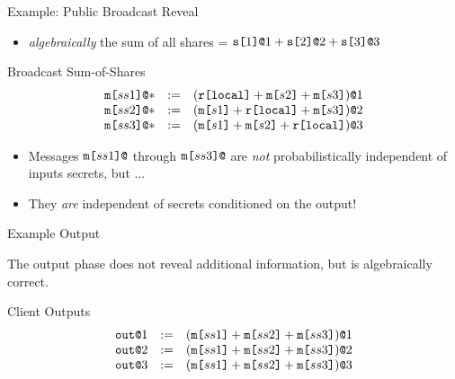 \documentclass{beamer}
\begin{document}
\begin{frame}{Example: Public Broadcast Reveal}

  \begin{itemize}
   \item \emph{algebraically} the sum of all shares = $\texttt{s[}1\texttt{]}\texttt{@}1 + \texttt{s[}2\texttt{]}\texttt{@}2 + \texttt{s[}3\texttt{]}\texttt{@}3$    
  \end{itemize}

  \begin{block}{Broadcast Sum-of-Shares}
    $$
    \begin{array}{lll}
      \texttt{m[}ss1\texttt{]}\texttt{@}* &:=& (\texttt{r[}\mathtt{local}\texttt{]} + \texttt{m[}s2\texttt{]} + \texttt{m[}s3\texttt{]})\texttt{@}1 \\ 
      \texttt{m[}ss2\texttt{]}\texttt{@}* &:=& (\texttt{m[}s1\texttt{]} + \texttt{r[}\mathtt{local}\texttt{]} + \texttt{m[}s3\texttt{]})\texttt{@}2 \\
      \texttt{m[}ss3\texttt{]}\texttt{@}* &:=& (\texttt{m[}s1\texttt{]} + \texttt{m[}s2\texttt{]} + \texttt{r[}\mathtt{local}\texttt{]})\texttt{@}3 
    \end{array}
    $$
  \end{block}

  \begin{itemize}
  \item Messages $\mx{ss1}$ through $\mx{ss3}$ are \emph{not} probabilistically independent of inputs
    secrets, but ...
  \item They \emph{are} independent of secrets conditioned on the output!
  \end{itemize}
  
\end{frame}

\begin{frame}{Example Output}

  The output phase does not reveal additional information, but is
  algebraically correct.
  \begin{block}{Client Outputs}
    $$
    \begin{array}{lll}
      \texttt{out}\texttt{@}1 &:=& (\texttt{m[}ss1\texttt{]} + \texttt{m[}ss2\texttt{]} + \texttt{m[}ss3\texttt{]})\texttt{@}1\\
      \texttt{out}\texttt{@}2 &:=& (\texttt{m[}ss1\texttt{]} + \texttt{m[}ss2\texttt{]} + \texttt{m[}ss3\texttt{]})\texttt{@}2\\
      \texttt{out}\texttt{@}3 &:=& (\texttt{m[}ss1\texttt{]} + \texttt{m[}ss2\texttt{]} + \texttt{m[}ss3\texttt{]})\texttt{@}3
    \end{array}
    $$
  \end{block}
  
\end{frame}
\end{document}
